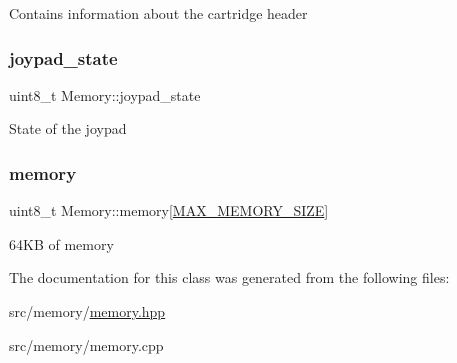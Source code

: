 Contains information about the cartridge header \mbox{\label{classMemory_a2f955513866ad9611418411e921ac120}} 
\subsubsection{\texorpdfstring{joypad\+\_\+state}{joypad\_state}}
{\footnotesize\ttfamily uint8\+\_\+t Memory\+::joypad\+\_\+state}

State of the joypad \mbox{\label{classMemory_aebc199fcde72a7b3b64eb1a2b670e9ad}} 
\subsubsection{\texorpdfstring{memory}{memory}}
{\footnotesize\ttfamily uint8\+\_\+t Memory\+::memory\mbox{[}\mbox{\hyperlink{memory_8hpp_a85ba7d05d77c30e9d24c88c1419b52b8}{M\+A\+X\+\_\+\+M\+E\+M\+O\+R\+Y\+\_\+\+S\+I\+ZE}}\mbox{]}\hspace{0.3cm}{\ttfamily [private]}}

64\+KB of memory 

The documentation for this class was generated from the following files\+:\begin{DoxyCompactItemize}
\item 
src/memory/\mbox{\hyperlink{memory_8hpp}{memory.\+hpp}}\item 
src/memory/memory.\+cpp\end{DoxyCompactItemize}
